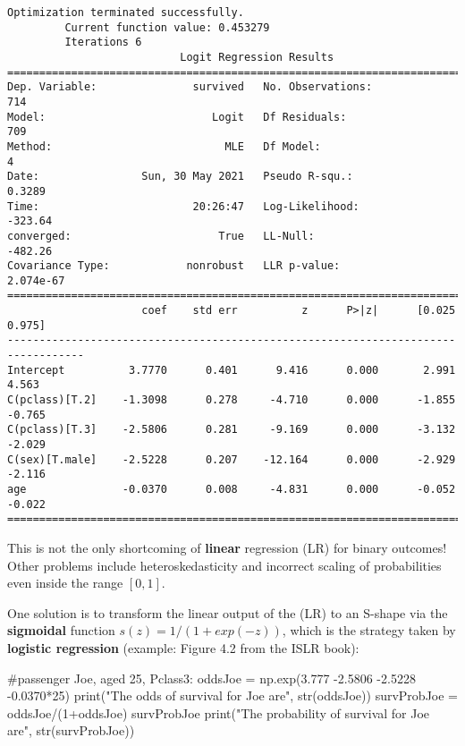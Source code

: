 \documentclass[
  letterpaper,
  DIV=11,
  numbers=noendperiod]{scrreprt}
\newenvironment{Shaded}{\begin{snugshade}}{\end{snugshade}}
\newcommand{\BuiltInTok}[1]{\textcolor[rgb]{0.00,0.23,0.31}{#1}}
\newcommand{\CommentTok}[1]{\textcolor[rgb]{0.37,0.37,0.37}{#1}}
\newcommand{\DecValTok}[1]{\textcolor[rgb]{0.68,0.00,0.00}{#1}}
\newcommand{\FloatTok}[1]{\textcolor[rgb]{0.68,0.00,0.00}{#1}}
\newcommand{\NormalTok}[1]{\textcolor[rgb]{0.00,0.23,0.31}{#1}}
\newcommand{\OperatorTok}[1]{\textcolor[rgb]{0.37,0.37,0.37}{#1}}
\newcommand{\StringTok}[1]{\textcolor[rgb]{0.13,0.47,0.30}{#1}}
\begin{document}
\begin{verbatim}
Optimization terminated successfully.
         Current function value: 0.453279
         Iterations 6
                           Logit Regression Results                           
==============================================================================
Dep. Variable:               survived   No. Observations:                  714
Model:                          Logit   Df Residuals:                      709
Method:                           MLE   Df Model:                            4
Date:                Sun, 30 May 2021   Pseudo R-squ.:                  0.3289
Time:                        20:26:47   Log-Likelihood:                -323.64
converged:                       True   LL-Null:                       -482.26
Covariance Type:            nonrobust   LLR p-value:                 2.074e-67
==================================================================================
                     coef    std err          z      P>|z|      [0.025      0.975]
----------------------------------------------------------------------------------
Intercept          3.7770      0.401      9.416      0.000       2.991       4.563
C(pclass)[T.2]    -1.3098      0.278     -4.710      0.000      -1.855      -0.765
C(pclass)[T.3]    -2.5806      0.281     -9.169      0.000      -3.132      -2.029
C(sex)[T.male]    -2.5228      0.207    -12.164      0.000      -2.929      -2.116
age               -0.0370      0.008     -4.831      0.000      -0.052      -0.022
==================================================================================
\end{verbatim}

This is not the only shortcoming of \textbf{linear} regression (LR) for
binary outcomes! Other problems include heteroskedasticity and incorrect
scaling of probabilities even inside the range \([0,1]\).

One solution is to transform the linear output of the (LR) to an S-shape
via the \textbf{sigmoidal} function \(s(z) = 1/(1+exp(-z))\), which is
the strategy taken by \textbf{logistic regression} (example: Figure 4.2
from the ISLR book):

\begin{Shaded}
\begin{Highlighting}[]
\CommentTok{\#passenger Joe, aged 25, Pclass3:}
\NormalTok{oddsJoe }\OperatorTok{=}\NormalTok{ np.exp(}\FloatTok{3.777} \OperatorTok{{-}}\FloatTok{2.5806}  \OperatorTok{{-}}\FloatTok{2.5228}  \OperatorTok{{-}}\FloatTok{0.0370}\OperatorTok{*}\DecValTok{25}\NormalTok{)}
\BuiltInTok{print}\NormalTok{(}\StringTok{"The odds of survival for Joe are"}\NormalTok{, }\BuiltInTok{str}\NormalTok{(oddsJoe))}
\NormalTok{survProbJoe }\OperatorTok{=}\NormalTok{ oddsJoe}\OperatorTok{/}\NormalTok{(}\DecValTok{1}\OperatorTok{+}\NormalTok{oddsJoe)}
\NormalTok{survProbJoe}
\BuiltInTok{print}\NormalTok{(}\StringTok{"The probability of survival for Joe are"}\NormalTok{, }\BuiltInTok{str}\NormalTok{(survProbJoe))}
\end{Highlighting}
\end{Shaded}
\end{document}
